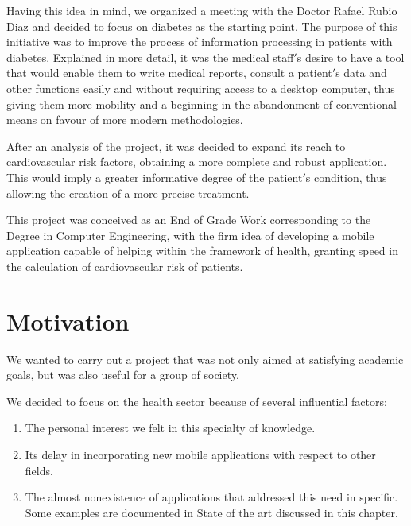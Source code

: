 \documentclass[11pt,spanish,
		listoftables,listoffigures]
		{tfgplantilla}
\begin{document}
Having this idea in mind, we organized a meeting with the Doctor Rafael Rubio Diaz and decided to focus on diabetes as the starting point. The purpose of this initiative was to improve the process of information processing in patients with diabetes. Explained in more detail, it was the medical staff$'$s desire to have a tool that would enable them to write medical reports, consult a patient$'$s data and other functions easily and without requiring access to a desktop computer, thus giving them more mobility and a beginning in the abandonment of conventional means on favour of more modern methodologies.

After an analysis of the project, it was decided to expand its reach to cardiovascular risk factors, obtaining a more complete and robust application. This would imply a greater informative degree of the patient$'$s condition, thus allowing the creation of a more precise treatment.

This project was conceived as an End of Grade Work corresponding to the Degree in Computer Engineering, with the firm idea of developing a mobile application capable of helping within the framework of health, granting speed in the calculation of cardiovascular risk of patients.

\section{Motivation}

We wanted to carry out a project that was not only aimed at satisfying academic goals, but was also useful for a group of society.

We decided to focus on the health sector because of several influential factors:

\begin{enumerate}
	\item The personal interest we felt in this specialty of knowledge.

	\item Its delay in incorporating new mobile applications with respect to other fields.

	\item The almost nonexistence of applications that addressed this need in specific. Some examples are documented in \textquotedbl State of the art \textquotedbl {} discussed in this chapter.
\end{enumerate}
\end{document}

